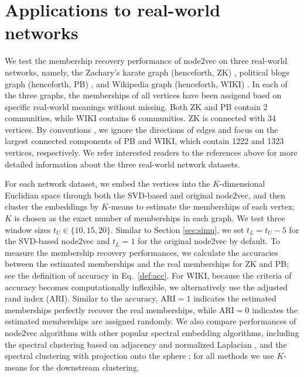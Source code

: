 \documentclass[10pt,journal,compsoc]{IEEEtran}
\numberwithin{equation}{section}
\begin{document}
\section{Applications to real-world networks}\label{sec:real}
We test the membership recovery performance of node2vec  on three real-world networks, namely, the Zachary's karate graph (henceforth, ZK) \cite{zachary1977information}, political blogs graph (henceforth, PB) \cite{adamic2005political}, and  Wikipedia graph (henceforth, WIKI) \cite{sussman2012consistent}.  In each of the three graphs, the memberships of all vertices have been assigend baed on specific real-world meanings without missing. Both ZK and PB contain 2 communities, while WIKI contains 6 communities. ZK is connected with 34 vertices. By conventions \cite{karrer2011stochastic,sussman2012consistent}, we ignore the directions of edges and focus on the largest connected components of PB and WIKI, which contain 1222 and 1323 vertices, respectively. We refer interested readers to the references above for more detailed information about the three real-world network datasets.
\par
For each network dataset, we embed the vertices  into the $K$-dimensional Euclidian space through both the SVD-based and original node2vec, and then cluster the embeddings by $K$-means to estimate the memberships of each vertex;  $K$ is chosen as the exact number of memberships in each graph. We test three window sizes $t_U \in \{ 10,15,20\}$. Similar to Section \ref{sec:simu}, we set $t_L = t_U -5$ for the SVD-based node2vec and $t_L = 1$ for the original node2vec by default. To measure the membership recovery performances, we calculate the accuracies between the estimated memberships and the real memberships for ZK and PB; see the definition of accuracy in Eq.~\eqref{def:acc}. For WIKI, because the criteria of accuracy becomes computationally inflexible, we alternatively use the adjusted rand index (ARI). Similar to the accuracy, $\text{ARI} = 1$ indicates the estimated memberships perfectly recover the real memberships, while  $\text{ARI} = 0$ indicates the estimated memberships are assigned randomly. We also compare  performances of node2vec algorithms with other popular spectral embedding algorithms, including the spectral clustering based on adjacency and normalized Laplacian \cite{von2007tutorial,rohe2011spectral,sussman2012consistent}, and the spectral clustering with projection onto the sphere \cite{modell2021spectral}; for all methods we use $K$-means for the downstream clustering. \par
\end{document}

